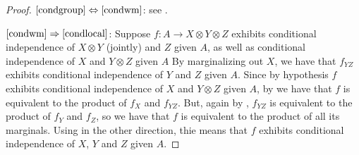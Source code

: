 \documentclass[a4paper,UKenglish,numberwithinsect,cleveref, autoref, thm-restate]{lipics-v2021}
\theoremstyle{plain} %
\theoremstyle{definition} %
\begin{document}
\begin{proof}
 $\ref{condgroup}\Leftrightarrow\ref{condwm}$: 
 see .
 
 $\ref{condwm}\Rightarrow\ref{condlocal}$: 
 Suppose $f:A\to X\otimes Y\otimes Z$ exhibits conditional independence of $X\otimes Y$ (jointly) and $Z$ given $A$, as well as conditional independence of $X$ and $Y\otimes Z$ given $A$
 By marginalizing out $X$, we have that $f_{YZ}$ exhibits conditional independence of $Y$ and $Z$ given $A$. 
 Since by hypothesis $f$ exhibits conditional independence of $X$ and $Y\otimes Z$ given $A$, by  we have that $f$ is equivalent to the product  of $f_X$ and $f_{YZ}$. But, again by , $f_{YZ}$ is equivalent to the product of $f_Y$ and $f_Z$, so we have that $f$ is equivalent to the product of all its marginals. Using  in the other direction, thie means that $f$ exhibits conditional independence of $X$, $Y$ and $Z$ given $A$. 
 

\end{proof}
\end{document}
